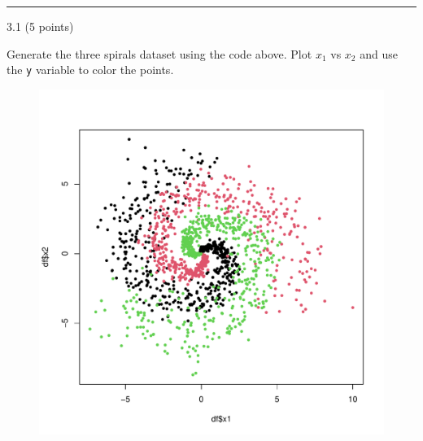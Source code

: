 \documentclass[
  letterpaper,
  DIV=11,
  numbers=noendperiod]{scrartcl}
\newenvironment{Shaded}{\begin{snugshade}}{\end{snugshade}}
\newcommand{\AttributeTok}[1]{\textcolor[rgb]{0.40,0.45,0.13}{#1}}
\newcommand{\DecValTok}[1]{\textcolor[rgb]{0.68,0.00,0.00}{#1}}
\newcommand{\FunctionTok}[1]{\textcolor[rgb]{0.28,0.35,0.67}{#1}}
\newcommand{\NormalTok}[1]{\textcolor[rgb]{0.00,0.23,0.31}{#1}}
\newcommand{\OtherTok}[1]{\textcolor[rgb]{0.00,0.23,0.31}{#1}}
\newcommand{\SpecialCharTok}[1]{\textcolor[rgb]{0.37,0.37,0.37}{#1}}
\begin{document}
\begin{center}\rule{0.5\linewidth}{0.5pt}\end{center}

3.1 (5 points)

Generate the three spirals dataset using the code above. Plot \(x_1\) vs
\(x_2\) and use the \texttt{y} variable to color the points.

\begin{Shaded}
\end{Shaded}

\begin{figure}[H]

{\centering \includegraphics{hw5_files/figure-pdf/unnamed-chunk-26-1.pdf}

}

\end{figure}
\end{document}
